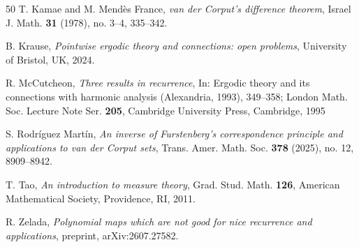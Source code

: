 \documentclass[reqno,a4paper,12pt]{amsart}
\theoremstyle{definition}
\theoremstyle{remark}
\begin{document}
\begin{thebibliography}{50}
 T. Kamae and M. Mend\`es France, \emph{van der Corput's difference theorem}, Israel J. Math. \textbf{31} (1978), no. 3--4, 335--342.

 B. Krause, \emph{Pointwise ergodic theory and connections: open problems}, University of Bristol, UK, 2024.

 R. McCutcheon, \emph{Three results in recurrence}, In: Ergodic theory and its connections with harmonic analysis (Alexandria, 1993), 349--358; London Math. Soc. Lecture Note Ser. \textbf{205}, Cambridge University Press, Cambridge, 1995

 S. Rodr\'iguez Mart\'in, \emph{An inverse of Furstenberg's correspondence principle and applications to van der Corput sets}, Trans. Amer. Math. Soc. \textbf{378} (2025), no. 12, 8909--8942.

 T. Tao, \emph{An introduction to measure theory}, Grad. Stud. Math. \textbf{126}, American Mathematical Society, Providence, RI, 2011.

 R. Zelada, \emph{Polynomial maps which are not good for nice recurrence and applications}, preprint, arXiv:2607.27582.

\end{thebibliography}
\end{document}
